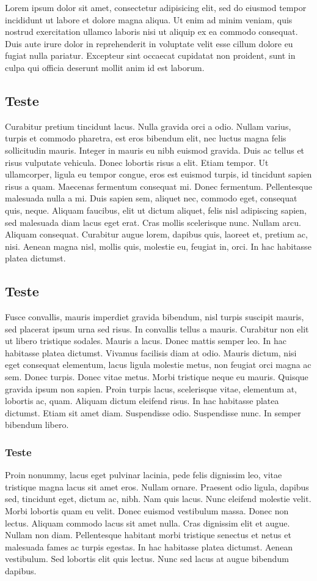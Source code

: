 Lorem ipsum dolor sit amet, consectetur adipisicing elit, sed do eiusmod tempor incididunt ut labore et dolore magna aliqua. Ut enim ad minim veniam, quis nostrud exercitation ullamco laboris nisi ut aliquip ex ea commodo consequat. Duis aute irure dolor in reprehenderit in voluptate velit esse cillum dolore eu fugiat nulla pariatur. Excepteur sint occaecat cupidatat non proident, sunt in culpa qui officia deserunt mollit anim id est laborum.

\subsection{Teste}
Curabitur pretium tincidunt lacus. Nulla gravida orci a odio. Nullam varius, turpis et commodo pharetra, est eros bibendum elit, nec luctus magna felis sollicitudin mauris. Integer in mauris eu nibh euismod gravida. Duis ac tellus et risus vulputate vehicula. Donec lobortis risus a elit. Etiam tempor. Ut ullamcorper, ligula eu tempor congue, eros est euismod turpis, id tincidunt sapien risus a quam. Maecenas fermentum consequat mi. Donec fermentum. Pellentesque malesuada nulla a mi. Duis sapien sem, aliquet nec, commodo eget, consequat quis, neque. Aliquam faucibus, elit ut dictum aliquet, felis nisl adipiscing sapien, sed malesuada diam lacus eget erat. Cras mollis scelerisque nunc. Nullam arcu. Aliquam consequat. Curabitur augue lorem, dapibus quis, laoreet et, pretium ac, nisi. Aenean magna nisl, mollis quis, molestie eu, feugiat in, orci. In hac habitasse platea dictumst.
\subsection{Teste}
Fusce convallis, mauris imperdiet gravida bibendum, nisl turpis suscipit mauris, sed placerat ipsum urna sed risus. In convallis tellus a mauris. Curabitur non elit ut libero tristique sodales. Mauris a lacus. Donec mattis semper leo. In hac habitasse platea dictumst. Vivamus facilisis diam at odio. Mauris dictum, nisi eget consequat elementum, lacus ligula molestie metus, non feugiat orci magna ac sem. Donec turpis. Donec vitae metus. Morbi tristique neque eu mauris. Quisque gravida ipsum non sapien. Proin turpis lacus, scelerisque vitae, elementum at, lobortis ac, quam. Aliquam dictum eleifend risus. In hac habitasse platea dictumst. Etiam sit amet diam. Suspendisse odio. Suspendisse nunc. In semper bibendum libero.

\subsubsection{Teste}
Proin nonummy, lacus eget pulvinar lacinia, pede felis dignissim leo, vitae tristique magna lacus sit amet eros. Nullam ornare. Praesent odio ligula, dapibus sed, tincidunt eget, dictum ac, nibh. Nam quis lacus. Nunc eleifend molestie velit. Morbi lobortis quam eu velit. Donec euismod vestibulum massa. Donec non lectus. Aliquam commodo lacus sit amet nulla. Cras dignissim elit et augue. Nullam non diam. Pellentesque habitant morbi tristique senectus et netus et malesuada fames ac turpis egestas. In hac habitasse platea dictumst. Aenean vestibulum. Sed lobortis elit quis lectus. Nunc sed lacus at augue bibendum dapibus.


